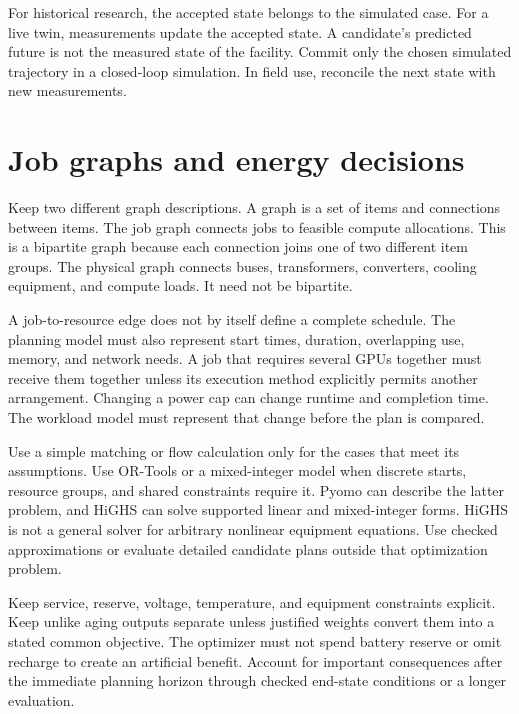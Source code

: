 \documentclass[11pt,a4paper]{report}
\begin{document}
For historical research, the accepted state belongs to the simulated case.
For a live twin, measurements update the accepted state.
A candidate's predicted future is not the measured state of the facility.
Commit only the chosen simulated trajectory in a closed-loop simulation.
In field use, reconcile the next state with new measurements.

\section{Job graphs and energy decisions}
Keep two different graph descriptions.
A graph is a set of items and connections between items.
The job graph connects jobs to feasible compute allocations.
This is a bipartite graph because each connection joins one of two different item groups.
The physical graph connects buses, transformers, converters, cooling equipment, and compute loads.
It need not be bipartite.

A job-to-resource edge does not by itself define a complete schedule.
The planning model must also represent start times, duration, overlapping use, memory, and network needs.
A job that requires several GPUs together must receive them together unless its execution method explicitly permits another arrangement.
Changing a power cap can change runtime and completion time.
The workload model must represent that change before the plan is compared.

Use a simple matching or flow calculation only for the cases that meet its assumptions.
Use OR-Tools or a mixed-integer model when discrete starts, resource groups, and shared constraints require it.
Pyomo can describe the latter problem, and HiGHS can solve supported linear and mixed-integer forms.
HiGHS is not a general solver for arbitrary nonlinear equipment equations.
Use checked approximations or evaluate detailed candidate plans outside that optimization problem.

Keep service, reserve, voltage, temperature, and equipment constraints explicit.
Keep unlike aging outputs separate unless justified weights convert them into a stated common objective.
The optimizer must not spend battery reserve or omit recharge to create an artificial benefit.
Account for important consequences after the immediate planning horizon through checked end-state conditions or a longer evaluation.
\end{document}
